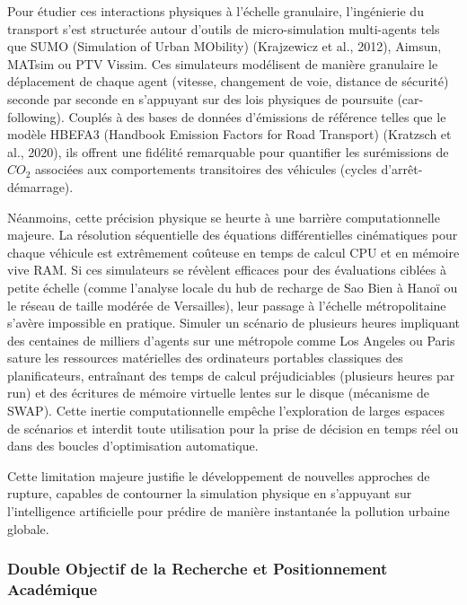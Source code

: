 \documentclass[10pt, a4paper]{article}
\begin{document}
Pour étudier ces interactions physiques à l'échelle granulaire,
l'ingénierie du transport s'est structurée autour d'outils de
micro-simulation multi-agents tels que SUMO (Simulation of Urban
MObility) (Krajzewicz et al., 2012), Aimsun, MATsim ou PTV Vissim. Ces
simulateurs modélisent de manière granulaire le déplacement de chaque
agent (vitesse, changement de voie, distance de sécurité) seconde par
seconde en s'appuyant sur des lois physiques de poursuite
(car-following). Couplés à des bases de données d'émissions de référence
telles que le modèle HBEFA3 (Handbook Emission Factors for Road
Transport) (Kratzsch et al., 2020), ils offrent une fidélité remarquable
pour quantifier les surémissions de \(CO_2\) associées aux comportements
transitoires des véhicules (cycles d'arrêt-démarrage).

Néanmoins, cette précision physique se heurte à une barrière
computationnelle majeure. La résolution séquentielle des équations
différentielles cinématiques pour chaque véhicule est extrêmement
coûteuse en temps de calcul CPU et en mémoire vive RAM. Si ces
simulateurs se révèlent efficaces pour des évaluations ciblées à petite
échelle (comme l'analyse locale du hub de recharge de Sao Bien à Hanoï
ou le réseau de taille modérée de Versailles), leur passage à l'échelle
métropolitaine s'avère impossible en pratique. Simuler un scénario de
plusieurs heures impliquant des centaines de milliers d'agents sur une
métropole comme Los Angeles ou Paris sature les ressources matérielles
des ordinateurs portables classiques des planificateurs, entraînant des
temps de calcul préjudiciables (plusieurs heures par run) et des
écritures de mémoire virtuelle lentes sur le disque (mécanisme de SWAP).
Cette inertie computationnelle empêche l'exploration de larges espaces
de scénarios et interdit toute utilisation pour la prise de décision en
temps réel ou dans des boucles d'optimisation automatique.

Cette limitation majeure justifie le développement de nouvelles
approches de rupture, capables de contourner la simulation physique en
s'appuyant sur l'intelligence artificielle pour prédire de manière
instantanée la pollution urbaine globale.

\subsubsection{Double Objectif de la Recherche et Positionnement
Académique}\label{double-objectif-de-la-recherche-et-positionnement-acaduxe9mique}
\end{document}
